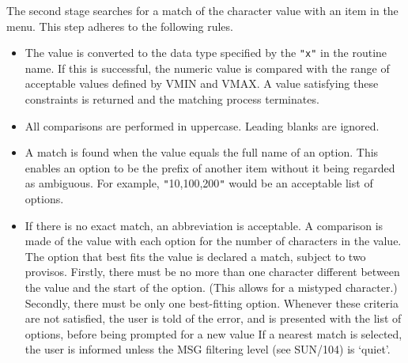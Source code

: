 \documentclass[twoside,11pt]{article}
\newcommand{\xref}[3]{#1}
\newcommand{\latex}[1]{#1}
\begin{document}
{{{      The second stage searches for a match of the character value with
      an item in the menu.  This step adheres to the following rules.
         \begin{itemize}
         \item  The value is converted to the data type specified by the
         {\tt "x"} in the routine name.  If this is successful, the numeric
         value is compared with the range of acceptable values defined
         by VMIN and VMAX.  A value satisfying these constraints is
         returned and the matching process terminates.
         \item  All comparisons are performed in uppercase.  Leading blanks
         are ignored.
         \item  A match is found when the value equals the full name of an
         option.  This enables an option to be the prefix of another
         item without it being regarded as ambiguous.  For example,
         {\tt "}10,100,200{\tt "} would be an acceptable list of options.
         \item If there is no exact match, an abbreviation is acceptable.
         A comparison is made of the value with each option for the
         number of characters in the value.  The option that best fits
         the value is declared a match, subject to two provisos.
         Firstly, there must be no more than one character different
         between the value and the start of the option.  (This allows
         for a mistyped character.)  Secondly, there must be only one
         best-fitting option.  Whenever these criteria are not
         satisfied, the user is told of the error, and is presented
         with the list of options, before being prompted for a new value
         If a nearest match is selected, the user is informed unless the
\xref{MSG filtering level}{sun104}{conditional_message_reporting}
\latex{ (see SUN/104)} is `quiet'.
         \end{itemize}
      }
   }
}
\end{document}
